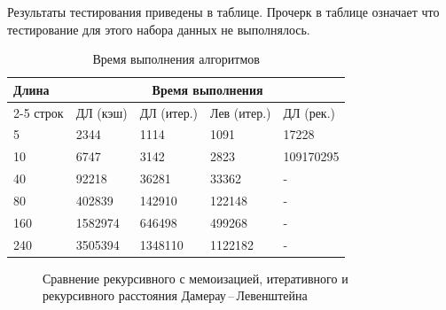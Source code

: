 Результаты тестирования приведены в таблице. Прочерк в таблице означает что тестирование для этого набора данных не выполнялось.

\begin{table}[ht!]
	\begin{center}
		\caption{Время выполнения алгоритмов}
		\begin{tabular}{ ||p{1.5cm}||p{2cm}|p{2cm}|p{2cm}|p{3.5cm}||  }
			\hline
			\multirow{2}{*}{Длина}& \multicolumn{4}{c||}{Время выполнения} \\[1.5ex]
			\cline{2-5} 
			строк& ДЛ (кэш)  & ДЛ (итер.) & Лев (итер.) & ДЛ (рек.) \\ [1.5ex] 
			\hline\hline
			5  & 2344 & 1114 & 1091 & 17228 \\
			10 & 6747 & 3142 & 2823 & 109170295 \\
			40 & 92218 & 36281 & 33362 &  - \\
			80 & 402839 & 142910 & 122148 & - \\
			160 & 1582974 & 646498 & 499268 & - \\
			240 & 3505394 & 1348110 & 1122182 & - \\
			\hline
		\end{tabular}
		\label{time-table}
	\end{center}
\end{table}

\newpage

\begin{figure}[ht!]
	\begin{center}
	\end{center}
	\caption{Сравнение рекурсивного с мемоизацией, итеративного и рекурсивного расстояния Дамерау\,--\,Левенштейна}
\end{figure}

